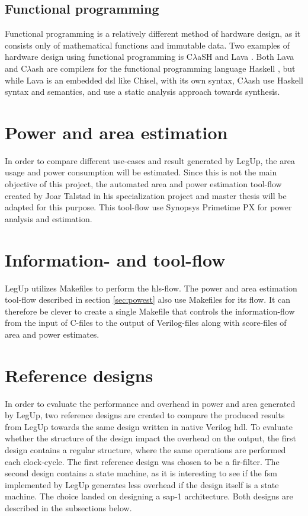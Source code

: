 \subsection{Functional programming}
Functional programming is a relatively different method of hardware design, as it consists only of mathematical functions and immutable data. Two examples of hardware design using functional programming is C$\lambda$aSH \cite{baaij2009clash} and Lava \cite{bjesse1998lava}. Both Lava and C$\lambda$ash are compilers for the functional programming language Haskell \cite{haskellonline}, but while Lava is an embedded \gls{dsl} like Chisel, with its own syntax, C$\lambda$ash use Haskell syntax and semantics, and use a static analysis approach towards synthesis.

\section{\label{sec:powest}Power and area estimation}
In order to compare different use-cases and result generated by LegUp, the area usage and power consumption will be estimated. Since this is not the main objective of this project, the automated area and power estimation tool-flow created by Joar Talstad in his specialization project \cite{talstad14project} and master thesis \cite{talstad15master} will be adapted for this purpose. This tool-flow use Synopsys Primetime PX for power analysis and estimation.

\section{Information- and tool-flow}
LegUp utilizes Makefiles to perform the \gls{hls}-flow. The power and area estimation tool-flow described in section \ref{sec:powest} also use Makefiles for its flow. It can therefore be clever to create a single Makefile that controls the information-flow from the input of C-files to the output of Verilog-files along with score-files of area and power estimates. 

\section{Reference designs}
\label{sec:refdes}
In order to evaluate the performance and overhead in power and area generated by LegUp, two reference designs are created to compare the produced results from LegUp towards the same design written in native Verilog \gls{hdl}. To evaluate whether the structure of the design impact the overhead on the output, the first design contains a regular structure, where the same operations are performed each clock-cycle. The first reference design was chosen to be a \gls{fir}-filter. The second design contains a state machine, as it is interesting to see if the \gls{fsm} implemented by LegUp generates less overhead if the design itself is a state machine. The choice landed on designing a \gls{sap-1} architecture. Both designs are described in the subsections below.

